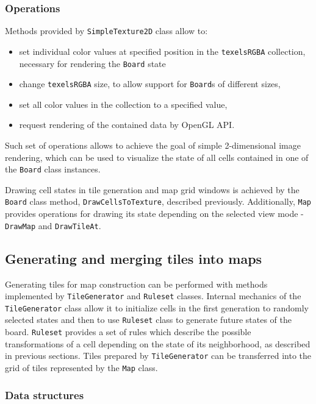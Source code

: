 \documentclass[12pt]{report}
\begin{document}
\subsubsection{Operations}

Methods provided by \texttt{SimpleTexture2D} class allow to:

\begin{itemize}
	\item set individual color values at specified position in the \texttt{texelsRGBA} collection, necessary for rendering the \texttt{Board} state
	\item change \texttt{texelsRGBA} size, to allow support for \texttt{Board}s of different sizes,
	\item set all color values in the collection to a specified value,
	\item request rendering of the contained data by OpenGL API.
\end{itemize}  

Such set of operations allows to achieve the goal of simple 2-dimensional image rendering, which can be used to visualize the state of all cells contained in one of the \texttt{Board} class instances.

Drawing cell states in tile generation and map grid windows is achieved by the \texttt{Board} class method, \texttt{DrawCellsToTexture}, described previously. Additionally, \texttt{Map} provides operations for drawing its state depending on the selected view mode - \texttt{DrawMap} and \texttt{DrawTileAt}.

\subsection{Generating and merging tiles into maps}

Generating tiles for map construction can be performed with methods implemented by \texttt{TileGenerator} and \texttt{Ruleset} classes. Internal mechanics of the \texttt{TileGenerator} class allow it to initialize cells in the first generation to randomly selected states and then to use \texttt{Ruleset} class to generate future states of the board. \texttt{Ruleset} provides a set of rules which describe the possible transformations of a cell depending on the state of its neighborhood, as described in previous sections. Tiles prepared by \texttt{TileGenerator} can be transferred into the grid of tiles represented by the \texttt{Map} class.

\subsubsection{Data structures} 
 
\end{document}

